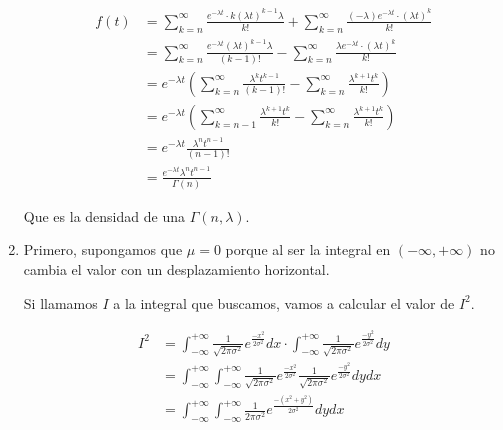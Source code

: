 \begin{enumerate}
		\begin{align*}
			f(t)	& = \sum_{k=n}^{\infty}\frac{e^{-\lambda t}\cdot k(\lambda t)^{k-1}\lambda}{k!} + \sum_{k=n}^{\infty}\frac{(-\lambda)e^{-\lambda t}\cdot(\lambda t)^k}{k!}	\\
					& = \sum_{k=n}^{\infty}\frac{e^{-\lambda t}(\lambda t)^{k-1}\lambda}{(k-1)!} - \sum_{k=n}^{\infty}\frac{\lambda e^{-\lambda t}\cdot(\lambda t)^k}{k!}		\\
					& = e^{-\lambda t} \left(\sum_{k=n}^{\infty}\frac{\lambda^k t^{k-1}}{(k-1)!} - \sum_{k=n}^{\infty}\frac{\lambda^{k+1} t^k}{k!}\right)						\\
					& = e^{-\lambda t} \left(\sum_{k=n-1}^{\infty}\frac{\lambda^{k+1} t^k}{k!} - \sum_{k=n}^{\infty}\frac{\lambda^{k+1} t^k}{k!}\right)						\\
					& = e^{-\lambda t} \frac{\lambda^{n} t^{n-1}}{(n-1)!}	\\
					& = \frac{e^{-\lambda t}\lambda^{n} t^{n-1}}{\Gamma(n)}
		\end{align*}
		
		Que es la densidad de una $\Gamma(n, \lambda)$.
	\item
		Primero, supongamos que $\mu=0$ porque al ser la integral en $(-\infty, +\infty)$ no cambia el valor con un desplazamiento horizontal.
		
		Si llamamos $I$ a la integral que buscamos, vamos a calcular el valor de $I^2$.
		
		\begin{align*}
			I^2	& = \int_{-\infty}^{+\infty} \frac{1}{\sqrt{2\pi \sigma^2}}e^{\frac{-x^2}{2\sigma^2}} dx	\cdot \int_{-\infty}^{+\infty} \frac{1}{\sqrt{2\pi \sigma^2}}e^{\frac{-y^2}{2\sigma^2}} dy	\\
				& = \int_{-\infty}^{+\infty} \int_{-\infty}^{+\infty} \frac{1}{\sqrt{2\pi \sigma^2}}e^{\frac{-x^2}{2\sigma^2}} \frac{1}{\sqrt{2\pi \sigma^2}}e^{\frac{-y^2}{2\sigma^2}} dy dx			\\
				& = \int_{-\infty}^{+\infty} \int_{-\infty}^{+\infty} \frac{1}{2\pi \sigma^2} e^{\frac{-(x^2+y^2)}{2\sigma^2}} dy dx
		\end{align*}
		

\end{enumerate}
